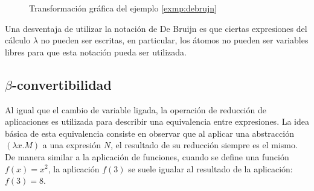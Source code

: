 \begin{figure}
  \centering

  
  \caption{Transformación gráfica del ejemplo \ref{exmp:debrujn}}
  \label{fig:debrujn}
\end{figure}

Una desventaja de utilizar la notación de De Bruijn es que ciertas expresiones del cálculo \( λ \) no pueden ser escritas, en particular, los átomos no pueden ser variables libres para que esta notación pueda ser utilizada.

\subsection{\texorpdfstring{\( β \)-convertibilidad}{beta-convertibilidad}}
\label{sec:beta-convertibildad}

Al igual que el cambio de variable ligada, la operación de reducción de aplicaciones es utilizada para describir una equivalencia entre expresiones. La idea básica de esta equivalencia consiste en observar que al aplicar una abstracción \( (λx.M) \) a una expresión \( N \), el resultado de su reducción siempre es el mismo. De manera similar a la aplicación de funciones, cuando se define una función \( f(x)=x^{2} \), la aplicación \( f(3) \) se suele igualar al resultado de la aplicación: \( f(3)=8 \).

